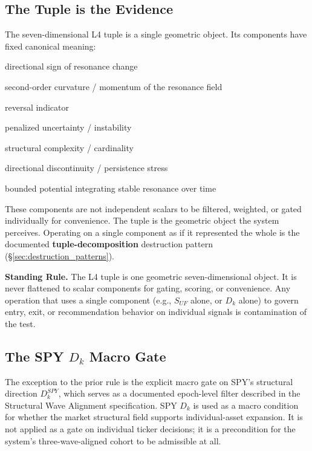 \documentclass[11pt, a4paper]{article}
\newcommand{\rulebox}[1]{%
  \begin{framed}\noindent\textbf{Standing Rule.} #1\end{framed}}
\theoremstyle{definition}
\begin{document}
\subsection{The Tuple is the Evidence}

The seven-dimensional L4 tuple is a single geometric object. Its components
have fixed canonical meaning:

\begin{description}[leftmargin=4em, labelwidth=3.5em]
\item[$D_k$]     directional sign of resonance change
\item[$M_k$]     second-order curvature / momentum of the resonance field
\item[$R_k$]     reversal indicator
\item[$U_k^{\ast}$] penalized uncertainty / instability
\item[$C_k$]     structural complexity / cardinality
\item[$P_k$]     directional discontinuity / persistence stress
\item[$B_k$]     bounded potential integrating stable resonance over time
\end{description}

These components are not independent scalars to be filtered, weighted, or
gated individually for convenience. The tuple is the geometric object the
system perceives. Operating on a single component as if it represented the
whole is the documented \textbf{tuple-decomposition} destruction pattern
(\S\ref{sec:destruction_patterns}).

\rulebox{The L4 tuple is one geometric seven-dimensional object. It is never
flattened to scalar components for gating, scoring, or convenience. Any
operation that uses a single component (e.g., $S_{UF}$ alone, or $D_k$ alone)
to govern entry, exit, or recommendation behavior on individual signals is
contamination of the test.}

\subsection{The SPY $D_k$ Macro Gate}

The exception to the prior rule is the explicit macro gate on SPY's structural
direction $D_k^{SPY}$, which serves as a documented epoch-level filter
described in the Structural Wave Alignment specification. SPY $D_k$ is used as
a macro condition for whether the market structural field supports
individual-asset expansion. It is not applied as a gate on individual ticker
decisions; it is a precondition for the system's three-wave-aligned cohort to
be admissible at all.
\end{document}
